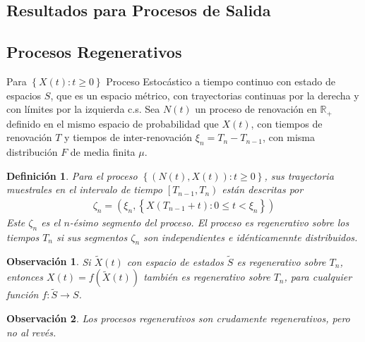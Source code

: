\documentclass{article}
\newtheorem{Def}{Definición}
\newtheorem{Obs}{Observación}
\newcommand{\rea}{\mathbb{R}}
\begin{document}
\subsection{Resultados para Procesos de Salida}




\subsection{Procesos Regenerativos}

Para $\left\{X\left(t\right):t\geq0\right\}$ Proceso Estoc\'astico a tiempo continuo con estado de espacios $S$, que es un espacio m\'etrico, con trayectorias continuas por la derecha y con l\'imites por la izquierda c.s. Sea $N\left(t\right)$ un proceso de renovaci\'on en $\rea_{+}$ definido en el mismo espacio de probabilidad que $X\left(t\right)$, con tiempos de renovaci\'on $T$ y tiempos de inter-renovaci\'on $\xi_{n}=T_{n}-T_{n-1}$, con misma distribuci\'on $F$ de media finita $\mu$.



\begin{Def}
Para el proceso $\left\{\left(N\left(t\right),X\left(t\right)\right):t\geq0\right\}$, sus trayectoria muestrales en el intervalo de tiempo $\left[T_{n-1},T_{n}\right)$ est\'an descritas por
\begin{eqnarray*}
\zeta_{n}=\left(\xi_{n},\left\{X\left(T_{n-1}+t\right):0\leq t<\xi_{n}\right\}\right)
\end{eqnarray*}
Este $\zeta_{n}$ es el $n$-\'esimo segmento del proceso. El proceso es regenerativo sobre los tiempos $T_{n}$ si sus segmentos $\zeta_{n}$ son independientes e id\'enticamennte distribuidos.
\end{Def}


\begin{Obs}
Si $\tilde{X}\left(t\right)$ con espacio de estados $\tilde{S}$ es regenerativo sobre $T_{n}$, entonces $X\left(t\right)=f\left(\tilde{X}\left(t\right)\right)$ tambi\'en es regenerativo sobre $T_{n}$, para cualquier funci\'on $f:\tilde{S}\rightarrow S$.
\end{Obs}

\begin{Obs}
Los procesos regenerativos son crudamente regenerativos, pero no al rev\'es.
\end{Obs}
\end{document}
